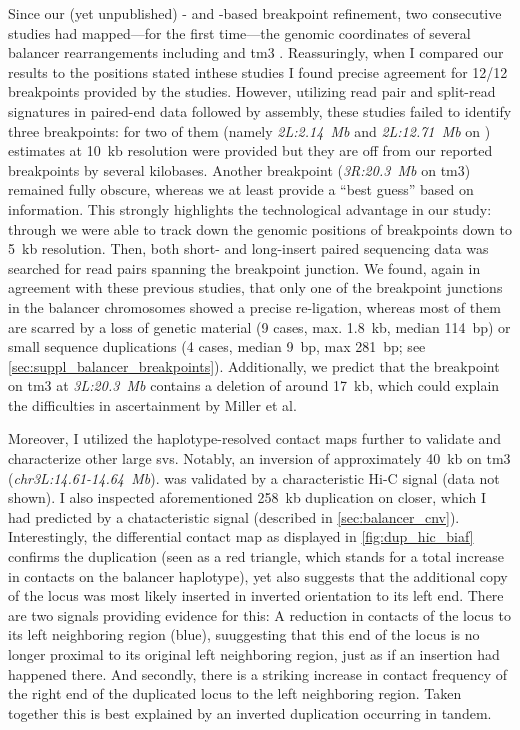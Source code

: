 Since our (yet unpublished) \hic- and \mps-based breakpoint refinement, two
consecutive studies had mapped---for the first time---the genomic coordinates of
several balancer rearrangements including \cyo and \ac{tm3}
\citep{Miller2018,Miller2018}. Reassuringly, when I compared our
results to the positions stated inthese studies I found precise agreement for
12/12 breakpoints provided by the studies. However, utilizing read pair and
split-read signatures in paired-end \mps data followed by assembly, these
studies failed to identify three breakpoints: for two of them (namely \textit{2L:2.14~Mb}
and \textit{2L:12.71~Mb} on \cyo) estimates at 10~kb resolution were provided but they are
off from our reported breakpoints by several kilobases. Another
breakpoint (\textit{3R:20.3~Mb} on \ac{tm3}) remained fully obscure, whereas we at least
provide a ``best guess'' based on \hic information. This strongly highlights the
technological advantage in our study: through \hic we were able to track down
the genomic positions of breakpoints down to 5~kb resolution. Then,
both short- and long-insert paired sequencing data was searched for read pairs
spanning the breakpoint junction. We found, again in agreement with these previous
studies, that only one of the breakpoint junctions in the balancer chromosomes
showed a precise re-ligation, whereas most of them are scarred by a
loss of genetic material (9 cases, max. 1.8~kb, median 114~bp) or small sequence
duplications (4 cases, median 9~bp, max 281~bp; see
\cref{sec:suppl_balancer_breakpoints}). Additionally, we predict that the
breakpoint on \ac{tm3} at \textit{3L:20.3~Mb} contains a deletion of around 17~kb, which could
explain the difficulties in ascertainment by Miller et al.

Moreover, I utilized the haplotype-resolved contact maps further to validate and
characterize other large \acp{sv}. Notably, an inversion of approximately 40~kb
on \ac{tm3} (\textit{chr3L:14.61-14.64~Mb}). was
validated by a characteristic Hi-C signal (data not shown). I also inspected
aforementioned 258~kb duplication on \cyo closer, which I had predicted by a
chatacteristic \baf signal (described in
\cref{sec:balancer_cnv}). Interestingly, the differential \hic contact map as
displayed in \cref{fig:dup_hic_biaf} confirms the duplication (seen as a red
triangle, which stands for a total increase in contacts on the balancer
haplotype), yet also suggests that the additional copy of the locus was most
likely inserted in inverted orientation to its left end. There are two signals
providing evidence for this: A reduction in contacts of the locus to its left
neighboring region (blue), suuggesting that this end of the locus is no longer
proximal to its original left neighboring region, just as if an insertion had
happened there. And secondly, there is a striking increase in contact frequency
of the right end of the duplicated locus to the left neighboring region. Taken
together this is best explained by an inverted duplication occurring in tandem.

